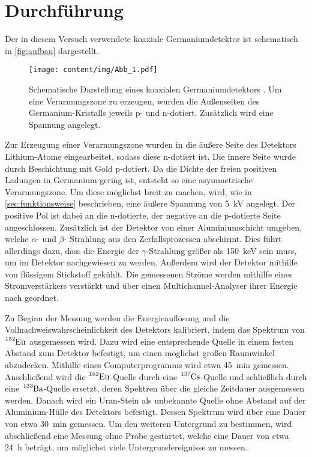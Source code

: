 \section{Durchführung}
\label{sec:durchfuehrung}

Der in diesem Versuch verwendete koaxiale Germaniumdetektor ist schematisch in \autoref{fig:aufbau} dargestellt.
\begin{figure}
    \centering
    \texttt{[image: content/img/Abb\_1.pdf]}
    \caption{
        Schematische Darstellung eines koaxialen Germaniumdetektors \cite{versuchsanleitung}.
        Um eine Verarmungszone zu erzeugen,
        wurden die Außenseiten des Germanium-Kristalls jeweils p- und n-dotiert.
        Zusätzlich wird eine Spannung angelegt.
    }
    \label{fig:aufbau}
\end{figure}

Zur Erzeugung einer Verarmungszone wurden in die äußere Seite des Detektors Lithium-Atome eingearbeitet,
sodass diese n-dotiert ist.
Die innere Seite wurde durch Beschichtung mit Gold p-dotiert.
Da die Dichte der freien positiven Ladungen in Germanium gering ist,
entsteht so eine asymmetrische Verarmungszone.
Um diese möglichst breit zu machen,
wird,
wie in \autoref{sec:funktionsweise} beschrieben,
eine äußere Spannung von \SI{5}{\kilo\volt} angelegt.
Der positive Pol ist dabei an die n-dotierte,
der negative an die p-dotierte Seite angeschlossen.
Zusätzlich ist der Detektor von einer Aluminiumschicht umgeben,
welche $\alpha$- und $\beta$- Strahlung aus den Zerfallsprozessen abschirmt.
Dies führt allerdings dazu,
dass die Energie der $\gamma$-Strahlung größer als \SI{150}{\kilo\eV} sein muss,
um im Detektor nachgewiesen zu werden.
Außerdem wird der Detektor mithilfe von flüssigem Stickstoff gekühlt.
Die gemessenen Ströme werden mithilfe eines Stromverstärkers verstärkt und über einen Multichannel-Analyser ihrer Energie nach geordnet.

Zu Beginn der Messung werden die Energieauflösung und die Vollnachweiswahrscheinlichkeit des Detektors kalibriert,
indem das Spektrum von $\ce{^152Eu}$ ausgemessen wird.
Dazu wird eine entsprechende Quelle in einem festen Abstand zum Detektor befestigt,
um einen möglichst großen Raumwinkel abzudecken.
Mithilfe eines Computerprogramms wird etwa \SI{45}{\minute} gemessen.
Anschließend wird die $\ce{^152Eu}$-Quelle durch eine $\ce{^137Cs}$-Quelle und schließlich durch eine $\ce{^133Ba}$-Quelle ersetzt,
deren Spektren über die gleiche Zeitdauer ausgemessen werden.
Danach wird ein Uran-Stein als unbekannte Quelle ohne Abstand auf der Aluminium-Hülle des Detektors befestigt.
Dessen Spektrum wird über eine Dauer von etwa \SI{30}{\minute} gemessen.
Um den weiteren Untergrund zu bestimmen,
wird abschließend eine Messung ohne Probe gestartet,
welche eine Dauer von etwa \SI{24}{\hour} beträgt,
um möglichst viele Untergrundereignisse zu messen.
